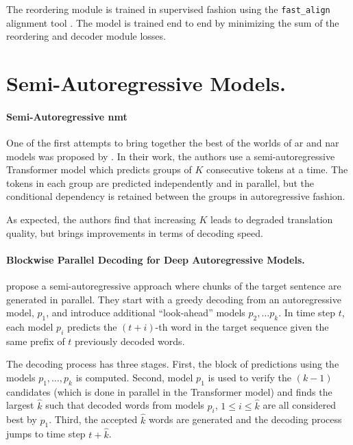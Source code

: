 The reordering module is trained in supervised fashion using the
\texttt{fast\_align} alignment tool \citep{dyer-etal-2013-simple}. The model is
trained end to end by minimizing the sum of the reordering and decoder module
losses.


\section{Semi-Autoregressive Models.}%
\label{sec:nat:semi}



\paragraph{Semi-Autoregressive \acs{nmt}} One of the first attempts to bring
together the best of the worlds of \ac{ar} and \ac{nar} models was proposed by
\citet{wang-etal-2018-semi}. In their work, the authors use a
semi-autoregressive Transformer model which predicts groups of $K$ consecutive
tokens at a time. The tokens in each group are predicted independently and in
parallel, but the conditional dependency is retained between the groups in
autoregressive fashion.

As expected, the authors find that increasing $K$ leads to degraded translation
quality, but brings improvements in terms of decoding speed.


\paragraph{Blockwise Parallel Decoding for Deep Autoregressive Models.}
\citet{stern2018blockwise} propose a semi-autoregressive approach where chunks
of the target sentence are generated in parallel.
%
They start with a greedy decoding from an autoregressive model, $p_1$, and
introduce additional ``look-ahead'' models $p_2, \ldots p_k$. In time step $t$,
each model $p_i$ predicts the $(t + i)$-th word in the target sequence given the
same prefix of $t$ previously decoded words.

The decoding process has three stages. First, the block of predictions using the
models $p_1, \ldots, p_k$ is computed. Second, model $p_1$ is used to verify the
$(k-1)$ candidates (which is done in parallel in the Transformer model) and
finds the largest $\hat{k}$ such that decoded words from models $p_i$,
$1 \leq i \leq \hat{k}$ are all considered best by $p_1$. Third, the accepted
$\hat{k}$ words are generated and the decoding process jumps to time step
$t + \hat{k}$.


